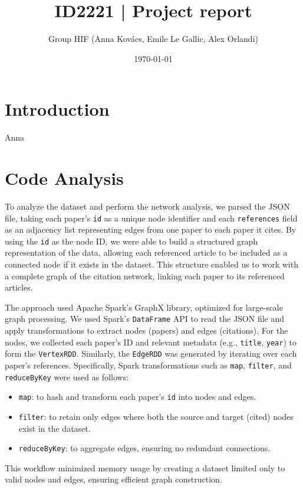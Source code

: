 \documentclass[a4paper, 11pt]{article}
\title{ID2221 | Project report}
\author{Group HIF (Anna Kovács, Emile Le Gallic, Alex Orlandi)}
\date{\today{}}
\begin{document}
\maketitle

\section{Introduction}

Anna

\section{Code Analysis}

To analyze the dataset and perform the network analysis, we parsed the JSON file, taking each paper’s \texttt{id} as a unique node identifier and each \texttt{references} field as an adjacency list representing edges from one paper to each paper it cites. By using the \texttt{id} as the node ID, we were able to build a structured graph representation of the data, allowing each referenced article to be included as a connected node if it exists in the dataset. This structure enabled us to work with a complete graph of the citation network, linking each paper to its referenced articles.

The approach used Apache Spark’s GraphX library, optimized for large-scale graph processing. We used Spark’s \texttt{DataFrame} API to read the JSON file and apply transformations to extract nodes (papers) and edges (citations). For the nodes, we collected each paper's ID and relevant metadata (e.g., \texttt{title}, \texttt{year}) to form the \texttt{VertexRDD}. Similarly, the \texttt{EdgeRDD} was generated by iterating over each paper’s references. Specifically, Spark transformations such as \texttt{map}, \texttt{filter}, and \texttt{reduceByKey} were used as follows:
\begin{itemize}
    \item \texttt{map}: to hash and transform each paper’s \texttt{id} into nodes and edges.
    \item \texttt{filter}: to retain only edges where both the source and target (cited) nodes exist in the dataset.
    \item \texttt{reduceByKey}: to aggregate edges, ensuring no redundant connections.
\end{itemize}
This workflow minimized memory usage by creating a dataset limited only to valid nodes and edges, ensuring efficient graph construction.
\end{document}
